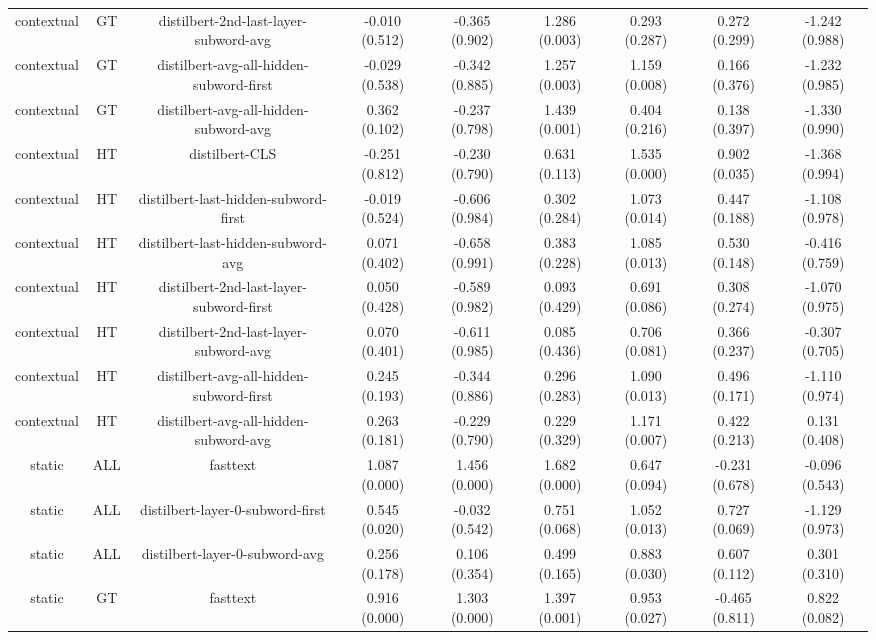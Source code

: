 \begin{sidewaystable}[htb]
\begin{tabular}{@{}ccccccccc@{}}
        contextual & GT & distilbert-2nd-last-layer-subword-avg & -0.010 (0.512) & -0.365 (0.902) & 1.286 (0.003) & 0.293 (0.287) & 0.272 (0.299) & -1.242 (0.988) \\
        contextual & GT & distilbert-avg-all-hidden-subword-first & -0.029 (0.538) & -0.342 (0.885) & 1.257 (0.003) & 1.159 (0.008) & 0.166 (0.376) & -1.232 (0.985) \\
        contextual & GT & distilbert-avg-all-hidden-subword-avg & 0.362 (0.102) & -0.237 (0.798) & 1.439 (0.001) & 0.404 (0.216) & 0.138 (0.397) & -1.330 (0.990) \\
        contextual & HT & distilbert-CLS & -0.251 (0.812) & -0.230 (0.790) & 0.631 (0.113) & 1.535 (0.000) & 0.902 (0.035) & -1.368 (0.994) \\
        contextual & HT & distilbert-last-hidden-subword-first & -0.019 (0.524) & -0.606 (0.984) & 0.302 (0.284) & 1.073 (0.014) & 0.447 (0.188) & -1.108 (0.978) \\
        contextual & HT & distilbert-last-hidden-subword-avg & 0.071 (0.402) & -0.658 (0.991) & 0.383 (0.228) & 1.085 (0.013) & 0.530 (0.148) & -0.416 (0.759) \\
        contextual & HT & distilbert-2nd-last-layer-subword-first & 0.050 (0.428) & -0.589 (0.982) & 0.093 (0.429) & 0.691 (0.086) & 0.308 (0.274) & -1.070 (0.975) \\
        contextual & HT & distilbert-2nd-last-layer-subword-avg & 0.070 (0.401) & -0.611 (0.985) & 0.085 (0.436) & 0.706 (0.081) & 0.366 (0.237) & -0.307 (0.705) \\
        contextual & HT & distilbert-avg-all-hidden-subword-first & 0.245 (0.193) & -0.344 (0.886) & 0.296 (0.283) & 1.090 (0.013) & 0.496 (0.171) & -1.110 (0.974) \\
        contextual & HT & distilbert-avg-all-hidden-subword-avg & 0.263 (0.181) & -0.229 (0.790) & 0.229 (0.329) & 1.171 (0.007) & 0.422 (0.213) & 0.131 (0.408) \\
        static & ALL & fasttext & 1.087 (0.000) & 1.456 (0.000) & 1.682 (0.000) & 0.647 (0.094) & -0.231 (0.678) & -0.096 (0.543) \\
        static & ALL & distilbert-layer-0-subword-first & 0.545 (0.020) & -0.032 (0.542) & 0.751 (0.068) & 1.052 (0.013) & 0.727 (0.069) & -1.129 (0.973) \\
        static & ALL & distilbert-layer-0-subword-avg & 0.256 (0.178) & 0.106 (0.354) & 0.499 (0.165) & 0.883 (0.030) & 0.607 (0.112) & 0.301 (0.310) \\
        static & GT & fasttext & 0.916 (0.000) & 1.303 (0.000) & 1.397 (0.001) & 0.953 (0.027) & -0.465 (0.811) & 0.822 (0.082) \\

\end{tabular}
\end{sidewaystable}

